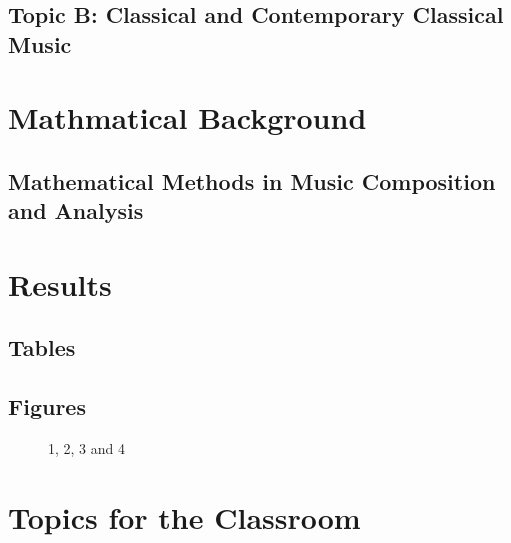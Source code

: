 \subsection{Topic B: Classical and Contemporary Classical Music}

\section{Mathmatical Background}

\subsection{Mathematical Methods in Music Composition and Analysis}

\section{Results}

\subsection{Tables}


\subsection{Figures}

\begin{figure}[H]
	\centering
	\begin{minipage}[b]{0.5\linewidth}
	\end{minipage}\hfill
	\begin{minipage}[b]{0.5\linewidth}
	\end{minipage}\hfill	
	\begin{minipage}[b]{0.5\linewidth}
	\end{minipage}\hfill
	\begin{minipage}[b]{0.5\linewidth}
	\end{minipage}\hfill
	\caption{1, 2, 3 and 4}
	\label{fig:Figure1}
\end{figure} 


\section{Topics for the Classroom}

\begin{enumerate}

\end{enumerate}




\begin{thebibliography}{00}

\end{thebibliography}


